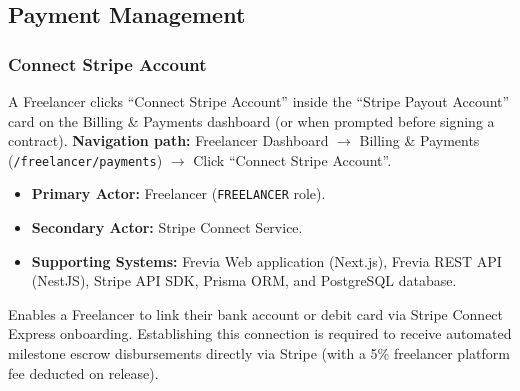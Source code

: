 
\subsection{Payment Management}

\subsubsection{ Connect Stripe Account}

A Freelancer clicks ``Connect Stripe Account'' inside the ``Stripe Payout Account'' card on the Billing \& Payments dashboard (or when prompted before signing a contract).\newline
\textbf{Navigation path:} Freelancer Dashboard $\rightarrow$ Billing \& Payments (\texttt{/\allowbreak{}freelancer/\allowbreak{}payments}) $\rightarrow$ Click ``Connect Stripe Account''.


\begin{itemize}[leftmargin=1.6em,topsep=3pt,itemsep=2pt,parsep=0pt,label=$\bullet$]
      \item \textbf{Primary Actor:} Freelancer (\texttt{FREELANCER} role).
      \item \textbf{Secondary Actor:} Stripe Connect Service.
      \item \textbf{Supporting Systems:} Frevia Web application (Next.js), Frevia REST API (NestJS), Stripe API SDK, Prisma ORM, and PostgreSQL database.
\end{itemize}

\noindent Enables a Freelancer to link their bank account or debit card via Stripe Connect Express onboarding. Establishing this connection is required to receive automated milestone escrow disbursements directly via Stripe (with a 5\% freelancer platform fee deducted on release).

